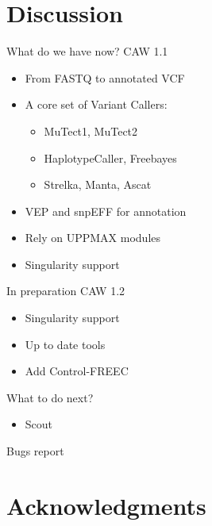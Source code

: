 \documentclass{beamer}
\begin{document}
\section{Discussion}

\begin{frame}{What do we have now?}
	CAW 1.1
	\begin{itemize}
		\item From FASTQ to annotated VCF
		\pause
		\item A core set of Variant Callers:
		\begin{itemize}
			\item MuTect1, MuTect2
			\item HaplotypeCaller, Freebayes
			\item Strelka, Manta, Ascat
		\end{itemize}
		\pause
		\item VEP and snpEFF for annotation
		\pause
		\item Rely on UPPMAX modules
		\pause
		\item Singularity support
	\end{itemize}
\end{frame}

\begin{frame}{In preparation}
	CAW 1.2
	\begin{itemize}
		\item Singularity support
		\item Up to date tools
		\item Add Control-FREEC
	\end{itemize}
\end{frame}

\begin{frame}{What to do next?}
	\begin{itemize}
		\item Scout
	\end{itemize}
\end{frame}

\begin{frame}{Bugs report}
\end{frame}

\section{Acknowledgments}
\end{document}
